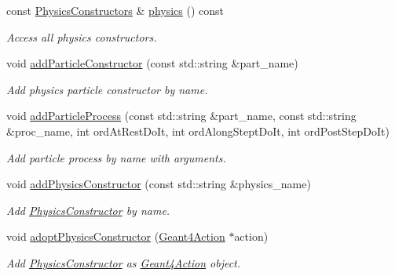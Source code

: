 \begin{DoxyCompactItemize}
const \hyperlink{class_d_d4hep_1_1_simulation_1_1_geant4_physics_list_a5953826b626c21fa4b26ab9a07f3b8ad}{Physics\+Constructors} \& \hyperlink{class_d_d4hep_1_1_simulation_1_1_geant4_physics_list_a9c7a312e78c18be81425089986eb540f}{physics} () const
\begin{DoxyCompactList}\small\item\em Access all physics constructors. \end{DoxyCompactList}\item 
void \hyperlink{class_d_d4hep_1_1_simulation_1_1_geant4_physics_list_ac4d76361cc1b439b42dc144a1e7fa988}{add\+Particle\+Constructor} (const std\+::string \&part\+\_\+name)
\begin{DoxyCompactList}\small\item\em Add physics particle constructor by name. \end{DoxyCompactList}\item 
void \hyperlink{class_d_d4hep_1_1_simulation_1_1_geant4_physics_list_a8c689c3ac8a923ff713c4389b5b502b4}{add\+Particle\+Process} (const std\+::string \&part\+\_\+name, const std\+::string \&proc\+\_\+name, int ord\+At\+Rest\+Do\+It, int ord\+Along\+Stept\+Do\+It, int ord\+Post\+Step\+Do\+It)
\begin{DoxyCompactList}\small\item\em Add particle process by name with arguments. \end{DoxyCompactList}\item 
void \hyperlink{class_d_d4hep_1_1_simulation_1_1_geant4_physics_list_af9405b117100861f7e365e8362a35fa4}{add\+Physics\+Constructor} (const std\+::string \&physics\+\_\+name)
\begin{DoxyCompactList}\small\item\em Add \hyperlink{class_d_d4hep_1_1_simulation_1_1_geant4_physics_list_1_1_physics_constructor}{Physics\+Constructor} by name. \end{DoxyCompactList}\item 
void \hyperlink{class_d_d4hep_1_1_simulation_1_1_geant4_physics_list_a36fe7b7937ffd99c7300c63983d625eb}{adopt\+Physics\+Constructor} (\hyperlink{class_d_d4hep_1_1_simulation_1_1_geant4_action}{Geant4\+Action} $\ast$action)
\begin{DoxyCompactList}\small\item\em Add \hyperlink{class_d_d4hep_1_1_simulation_1_1_geant4_physics_list_1_1_physics_constructor}{Physics\+Constructor} as \hyperlink{class_d_d4hep_1_1_simulation_1_1_geant4_action}{Geant4\+Action} object. \end{DoxyCompactList}\item 

\end{DoxyCompactItemize}
